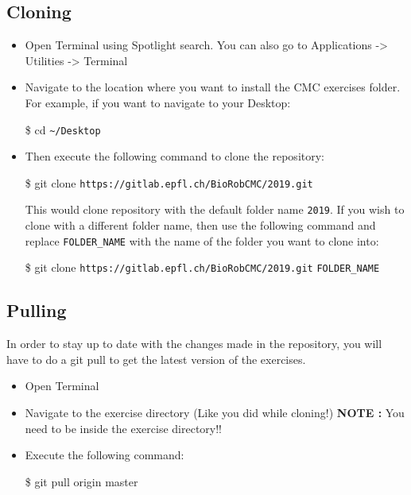 \documentclass{cmc}
\begin{document}
\subsection{Cloning}
\label{sec:macos_cloning}
\begin{itemize}
\item Open Terminal using Spotlight search. You can also go to
  Applications -> Utilities -> Terminal
\item Navigate to the location where you want to install the CMC
  exercises folder. For example, if you want to navigate to your
  Desktop:

  \begin{center}
    \$ cd \verb|~/Desktop|
  \end{center}

\item Then execute the following command to clone the repository:
  \begin{center}
    \$ git clone \verb|https://gitlab.epfl.ch/BioRobCMC/2019.git|
  \end{center}

  This would clone repository with the default folder name
  \verb|2019|. If you wish to clone with a different folder name, then
  use the following command and replace \verb|FOLDER_NAME| with the
  name of the folder you want to clone into:
  \begin{center}
    \$ git clone \verb|https://gitlab.epfl.ch/BioRobCMC/2019.git|
    \verb|FOLDER_NAME|
  \end{center}

\end{itemize}

\subsection{Pulling}
\label{sec:macos_pulling}

In order to stay up to date with the changes made in the repository,
you will have to do a git pull to get the latest version of the
exercises.

\begin{itemize}
\item Open Terminal
\item Navigate to the exercise directory (Like you did while cloning!)
  \textbf{NOTE : } You need to be inside the exercise directory!!
\item Execute the following command:
  \begin{center}
    \$ git pull origin master
  \end{center}
\end{itemize}
\end{document}
